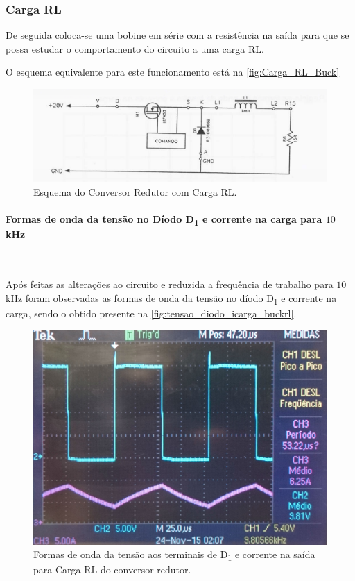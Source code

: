 \documentclass[a4paper,11pt]{article}
\numberwithin{equation}{section}
\begin{document}
\subsubsection{Carga RL}

De seguida coloca-se uma bobine em série com a resistência na saída para que se possa estudar o comportamento do circuito a uma carga RL.

O esquema equivalente para este funcionamento está na \autoref{fig:Carga_RL_Buck}

\begin{figure}[h]
	\centering
	\includegraphics[keepaspectratio=true, scale=0.8]{teoricas/Carga_RL_Buck}
	\caption{Esquema do Conversor Redutor com Carga RL.}
	\label{fig:Carga_RL_Buck}
	\vspace{-0.8em}
\end{figure}

\paragraph{Formas de onda da tensão no Díodo D\textsubscript{1} e corrente na carga para $10$ kHz}\mbox{}\

Após feitas as alterações ao circuito e reduzida a frequência de trabalho para $10$ kHz foram observadas as formas de onda da tensão no díodo D\textsubscript{1} e corrente na carga, sendo o obtido presente na \autoref{fig:tensao_diodo_icarga_buckrl}.

\begin{figure}[H]
	\centering
	\includegraphics[keepaspectratio=true, scale=0.13]{img/figs/tensao_diodo_icarga_buckrl}
	\caption{Formas de onda da tensão aos terminais de D\textsubscript{1} e corrente na saída para Carga RL do conversor redutor.}
	\label{fig:tensao_diodo_icarga_buckrl}
	\vspace{-0.8em}
\end{figure} 
\end{document}
